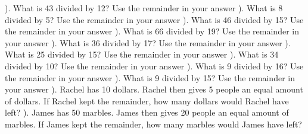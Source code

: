 \documentclass{article}%
\begin{document}
\newline%
\newline%
). What is 43 divided by 12? Use the remainder in your answer%
\newline%
\newline%
). What is 8 divided by 5? Use the remainder in your answer%
\newline%
\newline%
). What is 46 divided by 15? Use the remainder in your answer%
\newline%
\newline%
). What is 66 divided by 19? Use the remainder in your answer%
\newline%
\newline%
). What is 36 divided by 17? Use the remainder in your answer%
\newline%
\newline%
). What is 25 divided by 15? Use the remainder in your answer%
\newline%
\newline%
). What is 34 divided by 10? Use the remainder in your answer%
\newline%
\newline%
). What is 9 divided by 16? Use the remainder in your answer%
\newline%
\newline%
). What is 9 divided by 15? Use the remainder in your answer%
\newline%
\newline%
). Rachel has 10 dollars. Rachel then gives 5 people an equal amount of dollars. If Rachel kept the remainder, how many dollars would Rachel have left?%
\newline%
\newline%
). James has 50 marbles. James then gives 20 people an equal amount of marbles. If James kept the remainder, how many marbles would James have left?%
\newline%
\newline%
\end{document}
